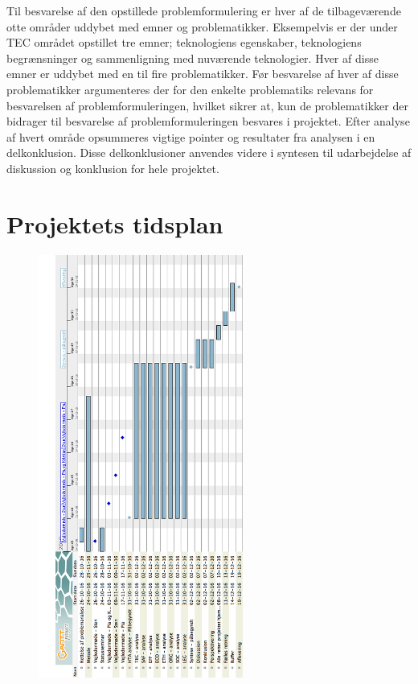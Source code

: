 Til besvarelse af den opstillede problemformulering er hver af de tilbageværende otte områder uddybet med emner og problematikker. Eksempelvis er der under TEC området opstillet tre emner; teknologiens egenskaber, teknologiens begrænsninger og sammenligning med nuværende teknologier. Hver af disse emner er uddybet med en til fire problematikker. Før besvarelse af hver af disse problematikker argumenteres der for den enkelte problematiks relevans for besvarelsen af problemformuleringen, hvilket sikrer at, kun de problematikker der bidrager til  besvarelse af problemformuleringen besvares i projektet. Efter analyse af hvert område opsummeres vigtige pointer og resultater fra analysen i en delkonklusion. Disse delkonklusioner anvendes videre i syntesen til udarbejdelse af diskussion og konklusion for hele projektet.    

\chapter{Projektets tidsplan}
\begin{figure}[H] 
	\begin{center}
		\includegraphics[width=0.6\textwidth]{../figures/cMetode/Projekt_tidsplan}
	\end{center}
	\label{fig:tidsplan} 
\end{figure} \vspace{-.50cm}

\begingroup
\label{litteraturliste}
\raggedright


\endgroup







